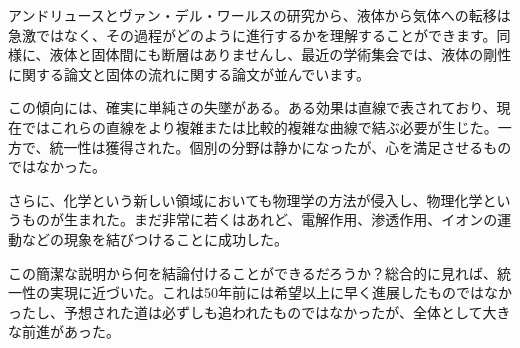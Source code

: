 \documentclass[a4paper,11pt,openany]{ltjsbook}
\begin{document}
アンドリュースとヴァン・デル・ワールスの研究から、液体から気体への転移は急激ではなく、その過程がどのように進行するかを理解することができます。同様に、液体と固体間にも断層はありませんし、最近の学術集会では、液体の剛性に関する論文と固体の流れに関する論文が並んでいます。

この傾向には、確実に単純さの失墜がある。ある効果は直線で表されており、現在ではこれらの直線をより複雑または比較的複雑な曲線で結ぶ必要が生じた。一方で、統一性は獲得された。個別の分野は静かになったが、心を満足させるものではなかった。

さらに、化学という新しい領域においても物理学の方法が侵入し、物理化学というものが生まれた。まだ非常に若くはあれど、電解作用、渗透作用、イオンの運動などの現象を結びつけることに成功した。

この簡潔な説明から何を結論付けることができるだろうか？総合的に見れば、統一性の実現に近づいた。これは50年前には希望以上に早く進展したものではなかったし、予想された道は必ずしも追われたものではなかったが、全体として大きな前進があった。
\end{document}

